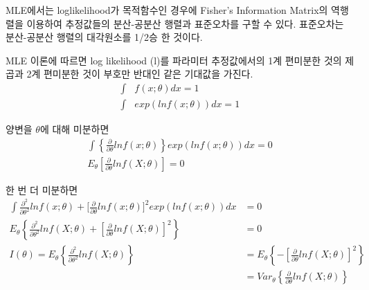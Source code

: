 \documentclass[
  11pt,
  krantz2,
  a4paper]{krantz}
\theoremstyle{definition}
\theoremstyle{definition}
\theoremstyle{definition}
\theoremstyle{remark}
\begin{document}
MLE에서는 loglikelihood가 목적함수인 경우에 Fisher's Information Matrix의 역행렬을 이용하여 추정값들의 분산-공분산 행렬과 표준오차를 구할 수 있다. 표준오차는 분산-공분산 행렬의 대각원소를 1/2승 한 것이다.

MLE 이론에 따르면 log likelihood (l)를 파라미터 추정값에서의 1계 편미분한 것의 제곱과 2계 편미분한 것이 부호만 반대인 같은 기대값을 가진다.
\begin{equation}
\begin{split}
  \int & f(x;\theta)dx = 1 \\
  \int & exp(lnf(x;\theta))dx = 1
\end{split}
\label{eq:mle-theory}
\end{equation}

양변을 \(\theta\)에 대해 미분하면
\begin{equation}
\begin{split}
\int\left\{ \frac{\partial}{\partial\theta}lnf(x;\theta) \right\} exp(lnf(x;\theta))dx = 0 \\
E_{\theta}\left\lbrack \frac{\partial}{\partial\theta}lnf(X;\theta) \right\rbrack = 0
\end{split}
\label{eq:theta-differential}
\end{equation}

한 번 더 미분하면
\begin{equation}
\begin{split}
\int{\frac{\partial^{2}}{\partial\theta^{2}}lnf(x;\theta) + \lbrack \frac{\partial}{\partial\theta}lnf(x;\theta) \rbrack^{2} } exp(lnf(x;\theta))dx &= 0 \\
E_{\theta}\left\{ \frac{\partial^{2}}{\partial\theta^{2}}lnf(X;\theta) + \left\lbrack \frac{\partial}{\partial\theta}lnf(X;\theta) \right\rbrack^{2} \right\} &= 0 \\
I(\theta) = E_{\theta}\left\{ \frac{\partial^{2}}{\partial\theta^{2}}lnf(X;\theta) \right\} & = E_{\theta}\left\{ - \left\lbrack \frac{\partial}{\partial\theta}lnf(X;\theta) \right\rbrack^{2} \right\} \\
&= Var_{\theta}\left\{ \frac{\partial}{\partial\theta}lnf(X;\theta) \right\} 
\end{split}
\label{eq:diff-diff}
\end{equation}
\end{document}
